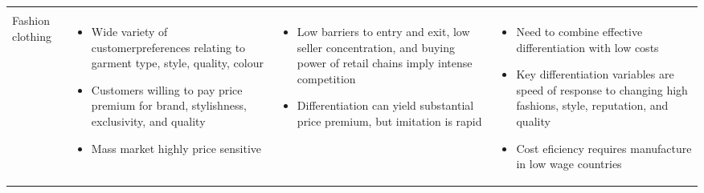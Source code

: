 {\begin{table}
\begin{tabular}{p{1cm} p{3cm} p{3.5cm} p{3cm}}
\begin{itemize}
		\end{itemize} \\
	Fashion clothing & 
		\begin{itemize}
			\item Wide variety of customerpreferences relating to garment type, style, quality, colour
			\item Customers willing to pay price premium for brand, stylishness, exclusivity, and quality
			\item Mass market highly price sensitive
		\end{itemize} &
		\begin{itemize}
			\item Low barriers to entry and exit, low seller concentration, and buying power of retail chains imply intense competition
			\item Differentiation can yield substantial price premium, but imitation is rapid
		\end{itemize} & 
		\begin{itemize}
			\item Need to combine effective differentiation with low costs
			\item Key differentiation variables are speed of response to changing high fashions, style, reputation, and quality
			\item Cost eficiency requires manufacture in low wage countries
		\end{itemize} \\
	\midrule
	\bottomrule
	\end{tabular}
	\end{table}
}

